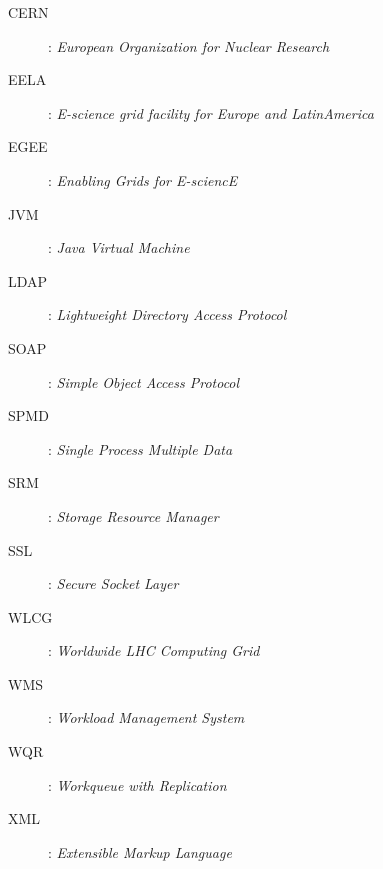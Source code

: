 \begin{description}

\item[CERN]:  	\textit{European Organization for Nuclear Research} 
\item[EELA]:  	\textit{E-science grid facility for Europe and LatinAmerica}
\item[EGEE]: 	\textit{Enabling Grids for E-sciencE}
\item[JVM]: 	\textit{Java Virtual Machine} 
\item[LDAP]:	 \textit{Lightweight Directory Access Protocol}
\item[SOAP]:	 \textit{Simple Object Access Protocol}
\item[SPMD]:	 \textit{Single Process Multiple Data}
\item[SRM]:	 \textit{Storage Resource Manager}
\item[SSL]:	 \textit{Secure Socket Layer}
\item[WLCG]:	 \textit{Worldwide LHC Computing Grid}
\item[WMS]:	 \textit{Workload Management System}
\item[WQR]:	\textit{Workqueue with Replication}  
\item[XML] : 	\textit{Extensible Markup Language} 


\end{description}